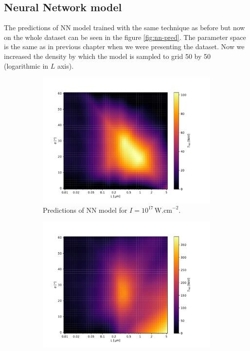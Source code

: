 \subsection*{Neural Network model}
The predictions of NN model trained with the same technique as before but now on the whole dataset can be seen in the figure \ref{fig:nn-pred}. The parameter space is the same as in previous chapter when we were presenting the dataset. Now we increased the density by which the model is sampled to grid 50 by 50 (logarithmic in $L$ axis).
\begin{figure}[ht]
	\centering
	\begin{subfigure}{0.49\textwidth}
		\centering
		\includegraphics[width=\textwidth]{figures/nn17_pred}
		\caption{Predictions of NN model for $I =  10^{17} \, \mathrm{W.cm}^{-2}$.}
		\label{fig:nn-pred-a}
	\end{subfigure}
	\hfill
	\begin{subfigure}{0.49\textwidth}
		\centering
		\includegraphics[width=\textwidth]{figures/nn18_pred}

\end{subfigure}
\end{figure}
